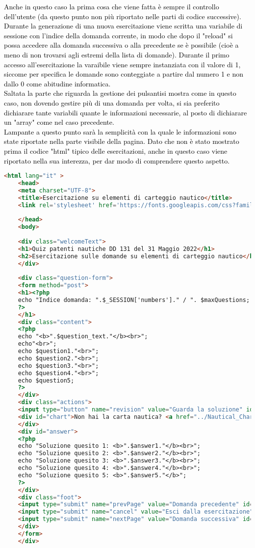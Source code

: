 \textcolor{black}{Anche in questo caso la prima cosa che viene fatta è sempre il controllo dell'utente (da questo punto non più riportato nelle parti di codice successive).  Durante la generazione di una nuova esercitazione viene scritta una variabile di sessione con l'indice della domanda corrente, in modo che dopo il "reload" si possa accedere alla domanda successiva o alla precedente se è possibile (cioè a meno di non trovarsi agli estremi della lista di domande). Durante il primo accesso all'esercitazione la varaibile viene sempre instanziata con il valore di 1, siccome per specifica le domande sono conteggiate a partire dal numero 1 e non dallo 0 come abitudine informatica.\\
Saltata la parte che riguarda la gestione dei pulsantisi mostra come in questo caso, non dovendo gestire più di una domanda per volta,  si sia preferito dichiarare tante variabili quante le informazioni necessarie, al posto di dichiarare un "array" come nel caso precedente.\\
Lampante a questo punto sarà la semplicità con la quale le informazioni sono state riportate nella parte visibile della pagina. Dato che non è stato mostrato prima il codice "html" tipico delle esercitazioni, anche in questo caso viene riportato nella sua interezza, per dar modo di comprendere questo aspetto.}\\

\begin{lstlisting}[language=html]
	<html lang="it" >
	<head>
	<meta charset="UTF-8">
	<title>Esercitazione su elementi di carteggio nautico</title>
	<link rel='stylesheet' href='https://fonts.googleapis.com/css?family=Rubik:400,700'><link rel="stylesheet" href="exerciseStyle.css">
	
	</head>
	<body>  
	
	<div class="welcomeText">
	<h1>Quiz patenti nautiche DD 131 del 31 Maggio 2022</h1>
	<h2>Esercitazione sulle domande su elementi di carteggio nautico</h2>
	</div>
	
	<div class="question-form">
	<form method="post">
	<h1><?php
	echo "Indice domanda: ".$_SESSION['numbers']." / ". $maxQuestions;
	?>
	</h1>
	<div class="content">
	<?php 
	echo "<b>".$question_text."</b><br>";
	echo"<br>";
	echo $question1."<br>";
	echo $question2."<br>";
	echo $question3."<br>";
	echo $question4."<br>";
	echo $question5;
	?> 
	</div>
	<div class="actions">
	<input type="button" name="revision" value="Guarda la soluzione" id="revision" onclick="check()"/>
	<div id="chart">Non hai la carta nautica? <a href="../Nautical_Charts/Carta_Nautica_5D.pdf" download> Scaricala qui</a></div>
	</div>
	<div id="answer">
	<?php
	echo "Soluzione quesito 1: <b>".$answer1."</b><br>";
	echo "Soluzione quesito 2: <b>".$answer2."</b><br>";
	echo "Soluzione quesito 3: <b>".$answer3."</b><br>";
	echo "Soluzione quesito 4: <b>".$answer4."</b><br>";
	echo "Soluzione quesito 5: <b>".$answer5."</b>";
	?>
	</div>
	<div class="foot">
	<input type="submit" name="prevPage" value="Domanda precedente" id="button3"/>
	<input type="submit" name="cancel" value="Esci dalla esercitazione" id="button2"/>
	<input type="submit" name="nextPage" value="Domanda successiva" id="button1"/>
	</div>
	</form>
	</div>
\end{lstlisting}

